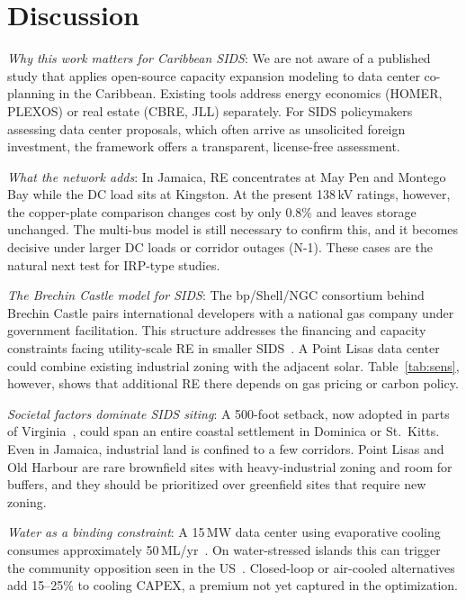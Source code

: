 \documentclass[conference,10pt]{IEEEtran}
\begin{document}
\section{Discussion}

\textit{Why this work matters for Caribbean SIDS}: We are not aware of a published study that applies open-source capacity expansion modeling to data center co-planning in the Caribbean. Existing tools address energy economics (HOMER, PLEXOS) or real estate (CBRE, JLL) separately. For SIDS policymakers assessing data center proposals, which often arrive as unsolicited foreign investment, the framework offers a transparent, license-free assessment.

\textit{What the network adds}: In Jamaica, RE concentrates at May Pen and Montego Bay while the DC load sits at Kingston. At the present 138\,kV ratings, however, the copper-plate comparison changes cost by only 0.8\% and leaves storage unchanged. The multi-bus model is still necessary to confirm this, and it becomes decisive under larger DC loads or corridor outages (N-1). These cases are the natural next test for IRP-type studies.

\textit{The Brechin Castle model for SIDS}: The bp/Shell/NGC consortium behind Brechin Castle pairs international developers with a national gas company under government facilitation. This structure addresses the financing and capacity constraints facing utility-scale RE in smaller SIDS~\cite{brechin_ecp}. A Point Lisas data center could combine existing industrial zoning with the adjacent solar. Table~\ref{tab:sens}, however, shows that additional RE there depends on gas pricing or carbon policy.

\textit{Societal factors dominate SIDS siting}: A 500-foot setback, now adopted in parts of Virginia~\cite{stafford2025}, could span an entire coastal settlement in Dominica or St.~Kitts. Even in Jamaica, industrial land is confined to a few corridors. Point Lisas and Old Harbour are rare brownfield sites with heavy-industrial zoning and room for buffers, and they should be prioritized over greenfield sites that require new zoning.

\textit{Water as a binding constraint}: A 15\,MW data center using evaporative cooling consumes approximately 50\,ML/yr~\cite{compass2025}. On water-stressed islands this can trigger the community opposition seen in the US~\cite{dcwatch2025}. Closed-loop or air-cooled alternatives add 15--25\% to cooling CAPEX, a premium not yet captured in the optimization.
\end{document}

